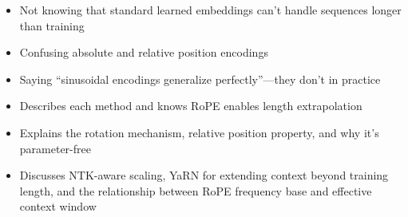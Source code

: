 \begin{interviewq}
\redflags
\begin{itemize}
    \item Not knowing that standard learned embeddings can't handle sequences longer than training
    \item Confusing absolute and relative position encodings
    \item Saying ``sinusoidal encodings generalize perfectly''---they don't in practice
\end{itemize}


\goodgreat
\begin{itemize}
    \item {} Describes each method and knows RoPE enables length extrapolation
    \item {} Explains the rotation mechanism, relative position property, and why it's parameter-free
    \item {} Discusses NTK-aware scaling, YaRN for extending context beyond training length, and the relationship between RoPE frequency base and effective context window
\end{itemize}

\end{interviewq}